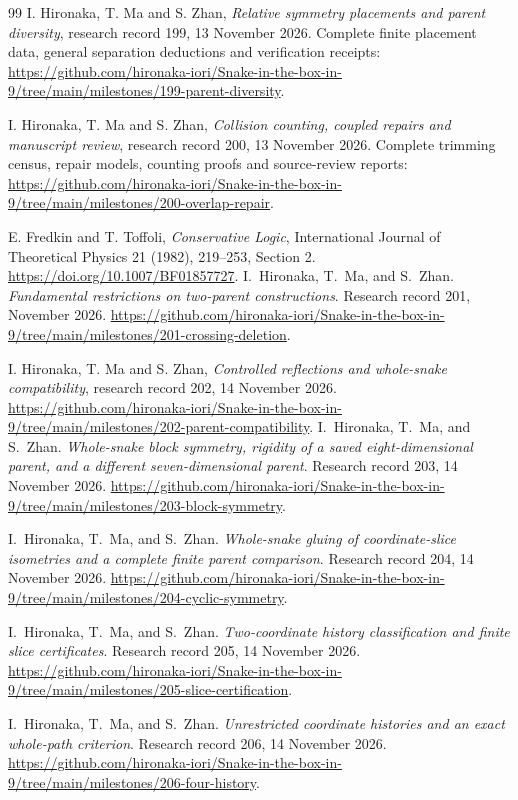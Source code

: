 \documentclass[11pt,a4paper]{article}
\theoremstyle{definition}
\theoremstyle{remark}
\begin{document}
\begin{thebibliography}{99}
I. Hironaka, T. Ma and S. Zhan,
\emph{Relative symmetry placements and parent diversity},
research record 199, 13 November 2026. Complete finite placement data,
general separation deductions and verification receipts:
\url{https://github.com/hironaka-iori/Snake-in-the-box-in-9/tree/main/milestones/199-parent-diversity}.


I. Hironaka, T. Ma and S. Zhan,
\emph{Collision counting, coupled repairs and manuscript review},
research record 200, 13 November 2026. Complete trimming census,
repair models, counting proofs and source-review reports:
\url{https://github.com/hironaka-iori/Snake-in-the-box-in-9/tree/main/milestones/200-overlap-repair}.

E. Fredkin and T. Toffoli,
\emph{Conservative Logic}, International Journal of Theoretical Physics
21 (1982), 219--253, Section 2.
\url{https://doi.org/10.1007/BF01857727}.
I.~Hironaka, T.~Ma, and S.~Zhan. \emph{Fundamental restrictions on
two-parent constructions}. Research record 201, November 2026.
\url{https://github.com/hironaka-iori/Snake-in-the-box-in-9/tree/main/milestones/201-crossing-deletion}.

I. Hironaka, T. Ma and S. Zhan,
\emph{Controlled reflections and whole-snake compatibility},
research record 202, 14 November 2026.
\url{https://github.com/hironaka-iori/Snake-in-the-box-in-9/tree/main/milestones/202-parent-compatibility}.
I.~Hironaka, T.~Ma, and S.~Zhan. \emph{Whole-snake block symmetry,
rigidity of a saved eight-dimensional parent, and a different
seven-dimensional parent}. Research record 203, 14 November 2026.
\url{https://github.com/hironaka-iori/Snake-in-the-box-in-9/tree/main/milestones/203-block-symmetry}.

I.~Hironaka, T.~Ma, and S.~Zhan. \emph{Whole-snake gluing of
coordinate-slice isometries and a complete finite parent comparison}.
Research record 204, 14 November 2026.
\url{https://github.com/hironaka-iori/Snake-in-the-box-in-9/tree/main/milestones/204-cyclic-symmetry}.

I.~Hironaka, T.~Ma, and S.~Zhan. \emph{Two-coordinate history
classification and finite slice certificates}. Research record 205,
14 November 2026.
\url{https://github.com/hironaka-iori/Snake-in-the-box-in-9/tree/main/milestones/205-slice-certification}.

I.~Hironaka, T.~Ma, and S.~Zhan. \emph{Unrestricted coordinate
histories and an exact whole-path criterion}. Research record 206,
14 November 2026.
\url{https://github.com/hironaka-iori/Snake-in-the-box-in-9/tree/main/milestones/206-four-history}.


\end{thebibliography}
\end{document}
